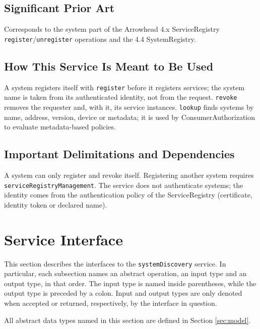 \documentclass[a4paper]{arrowhead}
\begin{document}
\subsection{Significant Prior Art}

Corresponds to the system part of the Arrowhead 4.x ServiceRegistry \texttt{register}/\texttt{unregister} operations and the 4.4 SystemRegistry.

\subsection{How This Service Is Meant to Be Used}

A system registers itself with \texttt{register} before it registers services; the system name is taken from its authenticated identity, not from the request. \texttt{revoke} removes the requester and, with it, its service instances. \texttt{lookup} finds systems by name, address, version, device or metadata; it is used by Consumer\allowbreak{}Authorization to evaluate metadata-based policies.

\subsection{Important Delimitations and Dependencies}
\label{sec:delimitations}

A system can only register and revoke itself. Registering another system requires \texttt{service\allowbreak{}Registry\allowbreak{}Management}. The service does not authenticate systems; the identity comes from the authentication policy of the ServiceRegistry (certificate, identity token or declared name).

\newpage

\section{Service Interface}
\label{sec:operations}

This section describes the interfaces to the \texttt{systemDiscovery} service.
In particular, each subsection names an abstract operation, an input type and an output type, in that order.
The input type is named inside parentheses, while the output type is preceded by a colon.
Input and output types are only denoted when accepted or returned, respectively, by the interface in question.

All abstract data types named in this section are defined in Section \ref{sec:model}.
\end{document}
